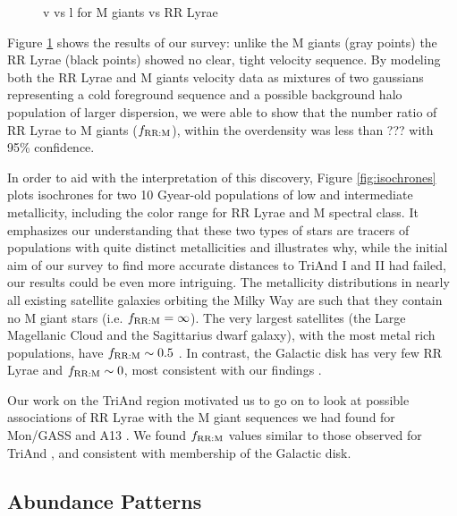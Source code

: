 \documentclass[galaxies,article,submit,moreauthors,pdftex,10pt,a4paper]{mdpi}
\begin{document}
\begin{figure}[t]
\centering
\caption{\label{fig:apw}
v vs l for M giants vs RR Lyrae}
\end{figure}

Figure \ref{fig:apw} \citep[reproduced from][]{pricewhelan15} shows the results of our survey: unlike the M giants (gray points) the RR Lyrae (black points) showed no clear, tight velocity sequence.
By modeling both the RR Lyrae and M giants velocity data as mixtures of two gaussians representing a cold foreground sequence and a possible background halo population of larger dispersion, we were able to show that the number ratio of RR Lyrae to M giants ($f_{\rm RR:M}$), within the overdensity was less than ??? with 95\% confidence.

In order to aid with the interpretation of this discovery, Figure \ref{fig:isochrones} plots isochrones for two 10 Gyear-old populations of low and intermediate metallicity, including the color range for RR Lyrae and M spectral class.
It emphasizes our understanding that these two types of stars are tracers of populations with quite distinct metallicities and illustrates why, while the initial aim of our survey to find more accurate distances to TriAnd I and II had failed, our results could be even more intriguing.
The metallicity distributions in nearly all existing satellite galaxies orbiting the Milky Way \citep[e.g.][]{kirby11} are such that they contain no M giant stars (i.e. $f_{\rm RR:M} = \infty$).
The very largest satellites (the Large Magellanic Cloud and the Sagittarius dwarf galaxy), with the most metal rich populations, have $f_{\rm RR:M}\sim 0.5$ \citep{pricewhelan15}.
In contrast, the Galactic disk has very few RR Lyrae and  $f_{\rm RR:M} \sim 0$, most consistent with our findings \citep{amrose01}.

Our work on the TriAnd region motivated us to go on to look at possible associations of RR Lyrae with the M giant sequences we had found for Mon/GASS and A13  \cite{sheffield17}.
We found $f_{\rm RR:M}$ values similar to those observed for TriAnd , and consistent with membership of the Galactic disk.


\subsection{Abundance Patterns}
\end{document}
